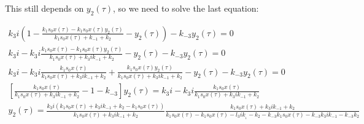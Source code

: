     This still depends on $y_2(\tau)$, so we need to solve the last equation:

    \begin{align*}
      k_3i\left(1-\frac{k_1s_0x(\tau)-k_1s_0x(\tau)y_2(\tau)}{k_1s_0x(\tau) + k_{-1}+k_2}-y_2(\tau)\right)-k_{-3}y_2(\tau) = 0\\
      k_3i-k_3i\frac{k_1s_0x(\tau)-k_1s_0x(\tau)y_2(\tau)}{k_1s_0x(\tau) + k_3ik_{-1}+k_2}-y_2(\tau)-k_{-3}y_2(\tau) = 0\\
      k_3i-k_3i\frac{k_1s_0x(\tau)}{k_1s_0x(\tau) + k_3ik_{-1}+k_2}+\frac{k_1s_0x(\tau)y_2(\tau)}{k_1s_0x(\tau) + k_3ik_{-1}+k_2}-y_2(\tau)-k_{-3}y_2(\tau) = 0\\
      \left[\frac{k_1s_0x(\tau)}{k_1s_0x(\tau) + k_3ik_{-1}+k_2}-1-k_{-3}\right]y_2(\tau) = k_3i-k_3i\frac{k_1s_0x(\tau)}{k_1s_0x(\tau) +k_3ik_{-1}+k_2}\\
      y_2(\tau) = \frac{k_3i(k_1s_0x(\tau) + k_3ik_{-1}+k_2 -k_1s_0x(\tau))}{k_1s_0x(\tau)+k_3ik_{-1} + k_2}\frac{k_1s_0x(\tau) + k_3ik_{-1} + k_2}{k_1s_0x(\tau) -k_1s_0x(\tau) -l_3ik_{_1} - k_2-k_{-3}k_1s_0x(\tau) - k_{-3}k_3ik_{-1} - k_{-3}k_2}\\
    \end{align*}












































